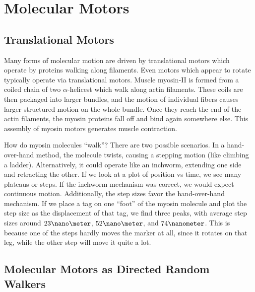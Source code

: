 \documentclass[a4paper,twoside,master.tex]{subfiles}
\begin{document}
\chapter{Molecular Motors}

\section{Translational Motors}\label{sec:translational_motors}

Many forms of molecular motion are driven by translational motors which operate by proteins walking along filaments. Even motors which appear to rotate typically operate via translational motors. Muscle myosin-II is formed from a coiled chain of two $ \alpha $-helicest which walk along actin filaments. These coils are then packaged into larger bundles, and the motion of individual fibers causes larger structured motion on the whole bundle. Once they reach the end of the actin filaments, the myosin proteins fall off and bind again somewhere else. This assembly of myosin motors generates muscle contraction.

How do myosin molecules ``walk''? There are two possible scenarios. In a hand-over-hand method, the molecule twists, causing a stepping motion (like climbing a ladder). Alternatively, it could operate like an inchworm, extending one side and retracting the other. If we look at a plot of position vs time, we see many plateaus or steps. If the inchworm mechanism was correct, we would expect continuous motion. Additionally, the step sizes favor the hand-over-hand mechanism. If we place a tag on one ``foot'' of the myosin molecule and plot the step size as the displacement of that tag, we find three peaks, with average step sizes around $ 23 \nano\meter $, $ 52\nano\meter $, and $ 74\nanometer $. This is because one of the steps hardly moves the marker at all, since it rotates on that leg, while the other step will move it quite a lot.

\section{Molecular Motors as Directed Random Walkers}\label{sec:molecular_motors_as_directed_random_walkers}
\end{document}
